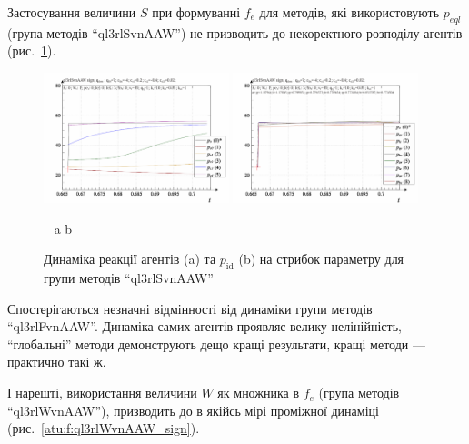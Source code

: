 Застосування величини
$S$ при формуванні
$f_e$ для методів, які використовують
$p_{eql}$ (група методів ``ql3rlSvnAAW'') не призводить до некоректного
розподілу агентів (рис.~\ref{atu:f:ql3rlSvnAAW_sign}).


\begin{figure}[htb!]
  \begin{center}
    \includegraphics[width=0.48\textwidth]{p/sign/qls-p_t_pi_m_ql3rlSvnAAW_sign.png}
    \hfill
    \includegraphics[width=0.48\textwidth]{p/sign/qls-p_t_p_m_ql3rlSvnAAW_sign.png}
  \end{center}
  \vspace{-1.0ex}
  \begin{center}
    ~ \hfill a \hfill\hfill b  \hfill ~
  \end{center}
  \vspace{-1.5ex}
  \caption{Динаміка реакції агентів (a) та $p_\mathrm{id}$ (b) на стрибок параметру для групи методів ``ql3rlSvnAAW''}
  \label{atu:f:ql3rlSvnAAW_sign}
\end{figure}

Спостерігаються незначні відмінності від динаміки групи
методів ``ql3rlFvnAAW''. Динаміка самих агентів проявляє велику
нелінійність, ``глобальні'' методи демонструють дещо кращі
результати, кращі методи --- практично такі ж.

І нарешті, використання величини
$W$ як множника в
$f_e$ (група методів ``ql3rlWvnAAW''), призводить до в якійсь мірі
проміжної динаміці (рис.~\ref{atu:f:ql3rlWvnAAW_sign}).


